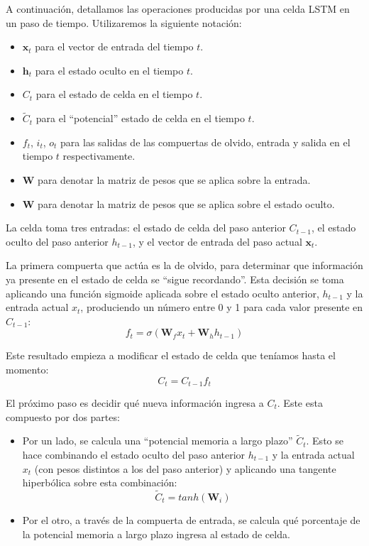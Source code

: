 \documentclass[../../main.tex]{subfiles}
\begin{document}
A continuación, detallamos las operaciones producidas por una celda LSTM en un paso de
tiempo. Utilizaremos la siguiente notación:
\begin{itemize}
    \item \(\bm{x}_t\) para el vector de entrada del tiempo \(t\).
    \item \(\bm{h}_t\) para el estado oculto en el tiempo \(t\).
    \item \(C_t\) para el estado de celda en el tiempo \(t\).
    \item \(\tilde{C}_t\) para el ``potencial'' estado de celda en el tiempo \(t\).
    \item \(f_t\), \(i_t\), \(o_t\) para las salidas de las compuertas de olvido,
    entrada y salida en el tiempo \(t\) respectivamente.
    \item \(\bm{W}\) para denotar la matriz de pesos que se aplica sobre la entrada.
    \item \(\bm{W}\) para denotar la matriz de pesos que se aplica sobre el
    estado oculto.
\end{itemize}

La celda toma tres entradas: el estado de celda del paso anterior \(C_{t-1}\),
el estado oculto del paso anterior \(h_{t-1}\), y el vector de entrada del paso actual
\(\bm{x}_t\).

La primera compuerta que actúa es la de olvido, para determinar que información ya
presente en el estado de celda se ``sigue recordando''. Esta decisión se toma aplicando
una función sigmoide aplicada sobre el estado oculto anterior, \(h_{t-1}\) y la entrada
actual \(x_t\), produciendo un número entre 0 y 1 para cada valor presente en \(C_{t-1}\):
\[
    f_t = \sigma \left( \bm{W}_f x_t + \bm{W}_h h_{t-1}  \right)
\]

Este resultado empieza a modificar el estado de celda que teníamos hasta el momento:
\[
    C_t = C_{t-1} f_t
\]

El próximo paso es decidir qué nueva información ingresa a \(C_t\). Este esta compuesto
por dos partes:
\begin{itemize}
    \item Por un lado, se calcula una ``potencial memoria a largo plazo'' \(\tilde{C}_t\).
    Esto se hace combinando el estado oculto del paso anterior \(h_{t-1}\) y la entrada
    actual \(x_t\) (con pesos distintos a los del paso anterior) y aplicando una tangente
    hiperbólica sobre esta combinación:
    \[
    \tilde{C}_t = tanh \left( \bm{W}_i\right)
    \]
    \item Por el otro, a través de la compuerta de entrada, se calcula qué porcentaje de
    la potencial memoria a largo plazo ingresa al estado de celda.
\end{itemize}
\end{document}
